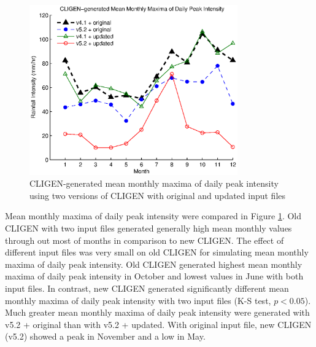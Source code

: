 \begin{figure}[htbp]
  \centering
    \includegraphics[width=0.8\textwidth]{./img/cligen_monthly_max_int_by_month}
  \caption{CLIGEN-generated mean monthly maxima of daily peak intensity
using two versions of CLIGEN with original and updated input files}
  \label{fig:cligen_dr_monthly_max_int_by_month}
\end{figure}

Mean monthly maxima of daily peak intensity were compared in Figure
\ref{fig:cligen_dr_monthly_max_int_by_month}. Old CLIGEN with two input files
generated generally high mean monthly values through out most of months in
comparison to new CLIGEN. The effect of different input files was very small
on old CLIGEN for simulating mean monthly maxima of daily peak intensity. Old
CLIGEN generated highest mean monthly maxima of daily peak intensity in October
and lowest values in June with both input files. In contrast, new CLIGEN
generated significantly different mean monthly maxima of daily peak intensity
with two input files (K-S test, $p<0.05$). Much greater mean monthly maxima of
daily peak intensity were generated with v5.2 + original than with v5.2 +
updated. With original input file, new CLIGEN (v5.2) showed a peak in
November and a low in May.

